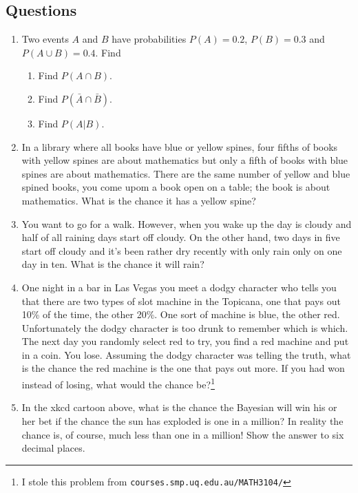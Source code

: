 \documentclass[11pt,a4paper]{scrartcl}
\begin{document}
\subsection*{Questions}


\begin{enumerate}

\item Two events $A$ and $B$ have probabilities $P(A)=0.2$, $P(B)=0.3$ and $P(A\cup B)=0.4$. Find
\begin{enumerate}
\item Find $P(A\cap B)$.
\item Find $P(\bar{A}\cap \bar{B})$.
\item Find $P(A|B)$.
\end{enumerate}

\item In a library where all books have blue or yellow spines, four
  fifths of books with yellow spines are about mathematics but only a
  fifth of books with blue spines are about mathematics. There are the
  same number of yellow and blue spined books, you come upom a book
  open on a table; the book is about mathematics. What is the chance
  it has a yellow spine?

\item You want to go for a walk. However, when you wake up the day is
  cloudy and half of all raining days start off cloudy. On the other
  hand, two days in five start off cloudy and it's been rather dry
  recently with only rain only on one day in ten. What is the chance
  it will rain?
  
\item One night in a bar in Las Vegas you meet a dodgy character who
  tells you that there are two types of slot machine in the Topicana,
  one that pays out 10\% of the time, the other 20\%. One sort of
  machine is blue, the other red. Unfortunately the dodgy character is
  too drunk to remember which is which. The next day you randomly
  select red to try, you find a red machine and put in a coin. You
  lose. Assuming the dodgy character was telling the truth, what is
  the chance the red machine is the one that pays out more. If you had
  won instead of losing, what would the chance be?\footnote{I stole
    this problem from \texttt{courses.smp.uq.edu.au/MATH3104/}}
  
\item In the xkcd cartoon above, what is the chance the Bayesian will
  win his or her bet if the chance the sun has exploded is one in a
  million? In reality the chance is, of course, much less than one in
  a million! Show the answer to six decimal places.
  
\end{enumerate}
\end{document}
